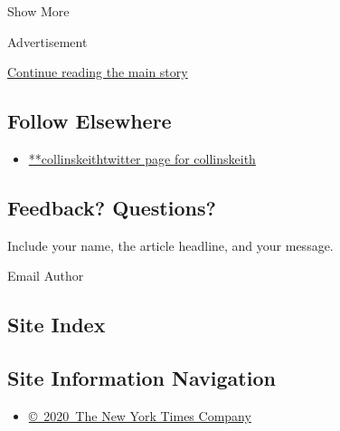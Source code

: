 Show More

Advertisement

\protect\hyperlink{after-mid2}{Continue reading the main story}

\hypertarget{follow-elsewhere}{%
\subsection{Follow Elsewhere}\label{follow-elsewhere}}

\begin{itemize}
\tightlist
\item
  \href{https://twitter.com/collinskeith}{**collinskeithtwitter page for
  collinskeith}
\end{itemize}

\hypertarget{feedback-questions}{%
\subsection{Feedback? Questions?}\label{feedback-questions}}

Include your name, the article headline, and your message.

Email Author

\hypertarget{site-index}{%
\subsection{Site Index}\label{site-index}}

\hypertarget{site-information-navigation}{%
\subsection{Site Information
Navigation}\label{site-information-navigation}}

\begin{itemize}
\tightlist
\item
  \href{https://help.nytimes3xbfgragh.onion/hc/en-us/articles/115014792127-Copyright-notice}{©~2020~The
  New York Times Company}
\end{itemize}

